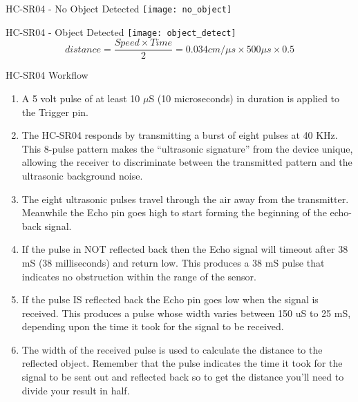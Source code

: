 \documentclass[12pt,letterpaper]{beamer}
\begin{document}
\begin{frame}{HC-SR04 - No Object Detected}
    \texttt{[image: no\_object]}
\end{frame}

\begin{frame}{HC-SR04 - Object Detected}
    \texttt{[image: object\_detect]}
    \begin{equation*}
        distance = \frac{Speed \times Time}{2} = 0.034cm/{\mu}s \times 500{\mu}s \times 0.5
    \end{equation*}
\end{frame}

\begin{frame}{HC-SR04 Workflow}

    {\scriptsize
        \begin{enumerate}
            \item A 5 volt pulse of at least 10 $\mu$S (10 microseconds) in duration is applied to the Trigger pin.
            \item The HC-SR04 responds by transmitting a burst of eight pulses at 40 KHz. This 8-pulse pattern makes the “ultrasonic signature” from the device unique, allowing the receiver to discriminate between the transmitted pattern and the ultrasonic background noise.
            \item The eight ultrasonic pulses travel through the air away from the transmitter. Meanwhile the Echo pin goes high to start forming the beginning of the echo-back signal.
            \item If the pulse in NOT reflected back then the Echo signal will timeout after 38 mS (38 milliseconds) and return low. This produces a 38 mS pulse that indicates no obstruction within the range of the sensor.
            \item If the pulse IS reflected back the Echo pin goes low when the signal is received.  This produces a pulse whose width varies between 150 uS to 25 mS, depending upon the time it took for the signal to be received.
            \item The width of the received pulse is used to calculate the distance to the reflected object. Remember that the pulse indicates the time it took for the signal to be sent out and reflected back so to get the distance you’ll need to divide your result in half.
        \end{enumerate}
    }
\end{frame}
\end{document}
